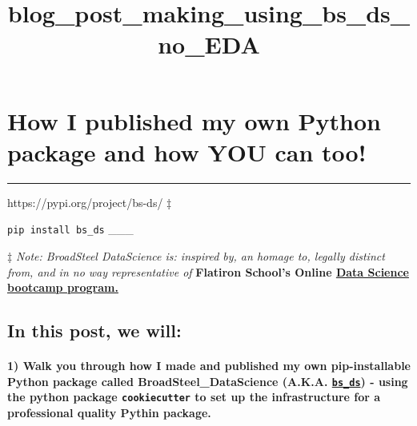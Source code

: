 \documentclass[11pt]{article}
\title{blog\_post\_making\_using\_bs\_ds\_no\_EDA}
\begin{document}
    
    
    \maketitle
    
    

    
    

    \hypertarget{how-i-published-my-own-python-package-and-how-you-can-too}{%
\section{How I published my own Python package and how YOU can
too!}\label{how-i-published-my-own-python-package-and-how-you-can-too}}

\begin{center}\rule{0.5\linewidth}{\linethickness}\end{center}

https://pypi.org/project/bs-ds/ ‡

\texttt{pip\ install\ bs\_ds} \_\_\_

‡ \emph{Note: BroadSteel DataScience is: inspired by, an homage to,
legally distinct from, and in no way representative of} \textbf{Flatiron
School's Online
\href{https://flatironschool.com/career-courses/data-science-bootcamp/online/}{Data
Science bootcamp program.}}

\hypertarget{in-this-post-we-will}{%
\subsection{\texorpdfstring{In this post, we
will:}{In this post, we will: }}\label{in-this-post-we-will}}

\hypertarget{walk-you-through-how-i-made-and-published-my-own-pip-installable-python-package-called-broadsteel_datascience-a.k.a.-bs_ds---using-the-python-package-cookiecutter-to-set-up-the-infrastructure-for-a-professional-quality-pythin-package.}{%
\paragraph{\texorpdfstring{1) \textbf{Walk you through how I made and
published my own pip-installable Python package} called
BroadSteel\_DataScience (A.K.A.
\href{https://pypi.org/project/bs-ds/}{\texttt{bs\_ds}}) - using the
python package \texttt{cookiecutter} to set up the infrastructure for a
professional quality Pythin
package.}{1) Walk you through how I made and published my own pip-installable Python package  called BroadSteel\_DataScience (A.K.A. bs\_ds) - using the python package cookiecutter to set up the infrastructure for a professional quality Pythin package.}}\label{walk-you-through-how-i-made-and-published-my-own-pip-installable-python-package-called-broadsteel_datascience-a.k.a.-bs_ds---using-the-python-package-cookiecutter-to-set-up-the-infrastructure-for-a-professional-quality-pythin-package.}}
\end{document}
